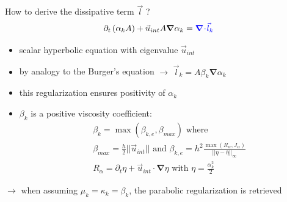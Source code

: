 \documentclass[xcolor=dvipsnames,10pt]{beamer}
\renewcommand{\div}{\boldsymbol{\nabla}\! \cdot \!}
\newcommand{\grad}{\boldsymbol{\nabla}}
\begin{document}
\begin{frame}{How to derive the dissipative term $\vec{l}$ ?}
\begin{equation}
\partial_t \left( \alpha_k  A\right) + \vec{u}_{int} A \grad \alpha_k = {\color{blue}\div \vec{l}_k} \nonumber
\end{equation}
\begin{block}{}
\begin{itemize}
\item scalar hyperbolic equation with eigenvalue $\vec{u}_{int}$
\item by analogy to the Burger's equation $\to$ $\vec{l}_k = A \beta_k \grad \alpha_k$
\item this regularization ensures positivity of $\alpha_k$
\item $\beta_k$ is a positive viscosity coefficient:
\begin{align}
&\beta_k = \max ( \beta_{k,e}, \beta_{max}) \text{ where }\nonumber \\
&\beta_{max} = \frac{h}{2} || \vec{u}_{int} || \text{ and } \beta_{k,e} = h^2 \frac{\max( R_\alpha, J_\alpha )}{|| \eta - \bar{\eta} ||_\infty} \nonumber \\
&R_\alpha = \partial_t \eta + \vec{u}_{int}\cdot \grad \eta \text{ with } \eta = \frac{\alpha_k^2}{2}  \nonumber
\end{align}
\end{itemize}
\end{block}
$\rightarrow$ when assuming $\mu_k = \kappa_k = \beta_k$, the parabolic regularization is retrieved
\end{frame}
\end{document}
